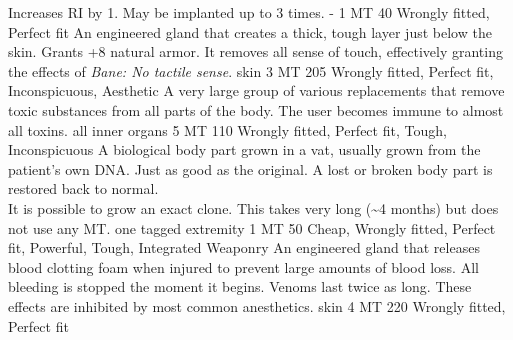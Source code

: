 \begin{multicols}{2}
    {Increases RI by 1.
        May be implanted up to 3 times.}
    {-}
    {1 MT}
    {40}
    {Wrongly fitted, Perfect fit}
    {An engineered gland that creates a thick, tough layer just below the skin.}
    {Grants +8 natural armor.
        It removes all sense of touch,
        effectively granting the effects of \emph{Bane: No tactile sense}.}
    {skin}
    {3 MT}
    {205}
    {Wrongly fitted, Perfect fit, Inconspicuous, Aesthetic}
    {A very large group of various replacements that remove toxic substances from all parts of the body.}
    {The user becomes immune to almost all toxins.}
    {all inner organs}
    {5 MT}
    {110}
    {Wrongly fitted, Perfect fit, Tough, Inconspicuous}
    {A biological body part grown in a vat,
        usually grown from the patient's own DNA.
        Just as good as the original.}
    {A lost or broken body part is restored back to normal.
    	\\%
        It is possible to grow an exact clone.
        This takes very long (\sim 4 months) but does not use any MT.}
    {one tagged extremity}
    {1 MT}
    {50}
    {Cheap, Wrongly fitted, Perfect fit, Powerful, Tough, Integrated Weaponry}
    {An engineered gland that releases blood clotting foam when injured to prevent large amounts of blood loss.}
    {All bleeding is stopped the moment it begins.
        Venoms last twice as long.
        These effects are inhibited by most common anesthetics.}
    {skin}
    {4 MT}
    {220}
    {Wrongly fitted, Perfect fit}
\end{multicols}

